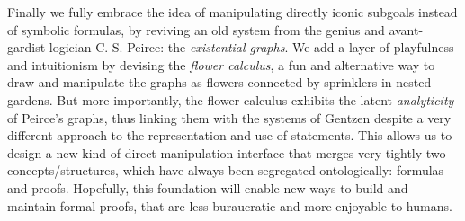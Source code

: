 Finally we fully embrace the idea of manipulating directly iconic subgoals
instead of symbolic formulas, by reviving an old system from the genius and
avant-gardist logician C. S. Peirce: the \emph{existential graphs}. We add a
layer of playfulness and intuitionism by devising the \emph{flower calculus}, a
fun and alternative way to draw and manipulate the graphs as flowers connected
by sprinklers in nested gardens. But more importantly, the flower calculus
exhibits the latent \emph{analyticity} of Peirce's graphs, thus linking them
with the systems of Gentzen despite a very different approach to the
representation and use of statements. This allows us to design a new kind of
direct manipulation interface that merges very tightly two concepts/structures,
which have always been segregated ontologically: formulas and proofs. Hopefully,
this foundation will enable new ways to build and maintain formal proofs, that
are less buraucratic and more enjoyable to humans.